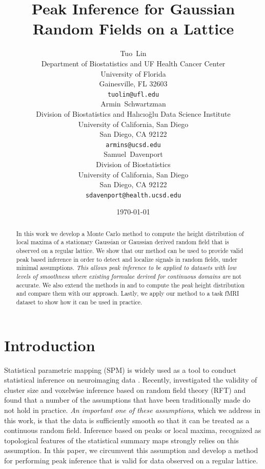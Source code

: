 \documentclass{article}
\title{Peak Inference for Gaussian Random Fields on a Lattice}
\date{\today}
\author{
  Tuo~Lin \\
  Department of Biostatistics and UF Health Cancer Center\\
  University of Florida\\
  Gainesville, FL 32603 \\
  \texttt{tuolin@ufl.edu} \\
   \And
 Armin~Schwartzman \\
  Division of Biostatistics and Hal{\i}c{\i}o\u{g}lu Data Science Institute\\
  University of California, San Diego\\
  San Diego, CA 92122 \\
  \texttt{armins@ucsd.edu} \\
  \And
  Samuel~Davenport\\
  Division of Biostatistics\\
  University of California, San Diego\\
  San Diego, CA 92122 \\
  \texttt{sdavenport@health.ucsd.edu}
}
\newcommand{\nt}[1]{\textit{\color{red} #1}}
\begin{document}
\maketitle


\begin{abstract}
In this work we develop a Monte Carlo method to compute the height distribution of local maxima of a stationary Gaussian or Gaussian derived random field that is observed on a regular lattice. We show that our method can be used to provide valid peak based inference in order to detect and localize signals in random fields, under minimal assumptions. \nt{This allows peak inference to be applied to datasets with low levels of smoothness where existing formulae derived for continuous domains are} not accurate. We also extend the methods in \cite{worsley2005improved} and \cite{taylor2007maxima} to compute the \nt{peak} height distribution and compare them with our approach. Lastly, we apply our method to a task fMRI dataset to show how it can be used in practice. 
\end{abstract}



\section{Introduction}
Statistical parametric mapping (SPM) is widely used as a tool to conduct statistical inference on neuroimaging data \citep{friston1989localisation, worsley1992three, worsley1996unified}. Recently, \cite{eklund2016cluster, eklund2019cluster} investigated the validity of cluster size and voxelwise inference based on random field theory (RFT) and found that a number of the assumptions that have been traditionally made do not hold in practice. \nt{An important one of these assumptions}, which we address in this work, is that the data is sufficiently smooth so that it can be treated as a continuous random field. Inference based on peaks or local maxima, recognized as topological features of the statistical summary maps \citep{chumbley2009false, chumbley2010topological, friston1989localisation, schwartzman2011multiple, cheng2017multiple} strongly relies on this assumption. In this paper, we circumvent this assumption and develop a method for performing peak inference that is valid for data observed on a regular lattice.
\end{document}
